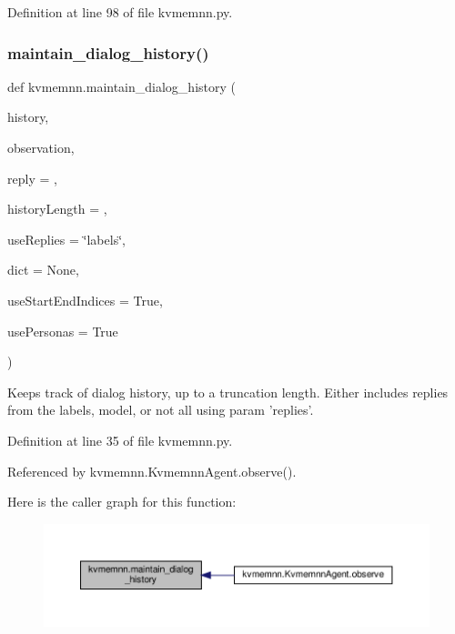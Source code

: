 Definition at line 98 of file kvmemnn.\+py.

\mbox{\label{namespacekvmemnn_a2a74a2753494bd274e31c8efd30f6067}} 
\subsubsection{\texorpdfstring{maintain\+\_\+dialog\+\_\+history()}{maintain\_dialog\_history()}}
{\footnotesize\ttfamily def kvmemnn.\+maintain\+\_\+dialog\+\_\+history (\begin{DoxyParamCaption}\item[{}]{history,  }\item[{}]{observation,  }\item[{}]{reply = {\ttfamily \textquotesingle{}\textquotesingle{}},  }\item[{}]{history\+Length = {},  }\item[{}]{use\+Replies = {\ttfamily \char`\"{}labels\char`\"{}},  }\item[{}]{dict = {\ttfamily None},  }\item[{}]{use\+Start\+End\+Indices = {\ttfamily True},  }\item[{}]{use\+Personas = {\ttfamily True} }\end{DoxyParamCaption})}

\begin{DoxyVerb}Keeps track of dialog history, up to a truncation length.
Either includes replies from the labels, model, or not all using param 'replies'.\end{DoxyVerb}
 

Definition at line 35 of file kvmemnn.\+py.



Referenced by kvmemnn.\+Kvmemnn\+Agent.\+observe().

Here is the caller graph for this function\+:
\nopagebreak
\begin{figure}[H]
\begin{center}
\leavevmode
\includegraphics[width=350pt]{namespacekvmemnn_a2a74a2753494bd274e31c8efd30f6067_icgraph}
\end{center}
\end{figure}
